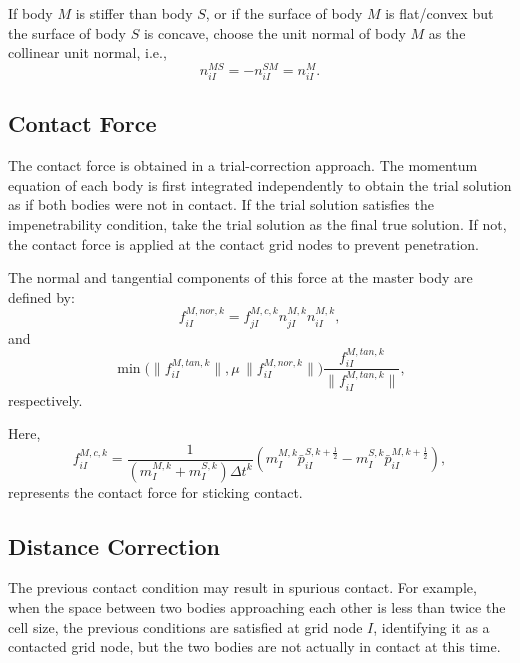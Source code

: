 If body $M$ is stiffer than body $S$, or if the surface of body $M$ is flat/convex but the surface of body $S$ is concave, choose the unit normal of body $M$ as the collinear unit normal, i.e.,
\begin{equation}
    n^{MS}_{iI} = -n^{SM}_{iI} = n^{M}_{iI}.
\end{equation}

\subsection{Contact Force}

The contact force is obtained in a trial-correction approach.  
The momentum equation of each body is first integrated independently to obtain the trial solution as if both bodies were not in contact.  
If the trial solution satisfies the impenetrability condition, take the trial solution as the final true solution.  
If not, the contact force is applied at the contact grid nodes to prevent penetration.

The normal and tangential components of this force at the master body are defined by:
\begin{equation}
    f^{M,nor,k}_{iI} = f^{M,c,k}_{jI} n^{M,k}_{jI} n^{M,k}_{iI},
\end{equation}
and
\begin{equation}
    \min \Big( \|f^{M,tan,k}_{iI}\|, \mu \, \| f^{M,nor,k}_{iI}\| \Big)
    \frac{f^{M,tan,k}_{iI}}{ \|f^{M,tan,k}_{iI}\|},
\end{equation}
respectively.

Here,
\begin{equation}
    f^{M,c,k}_{iI} = 
    \frac{1}{\left(m^{M,k}_{I} + m^{S,k}_{I}  \right)\Delta t^k}
    \left( m^{M,k}_{I} \bar{p}^{S,k+\frac{1}{2}}_{iI} - 
    m^{S,k}_{I} \bar{p}^{M,k+\frac{1}{2}}_{iI} \right),
\end{equation}
represents the contact force for sticking contact.

\subsection{Distance Correction}

The previous contact condition may result in spurious contact.  
For example, when the space between two bodies approaching each other is less than twice the cell size,  
the previous conditions are satisfied at grid node $I$, identifying it as a contacted grid node,  
but the two bodies are not actually in contact at this time.

